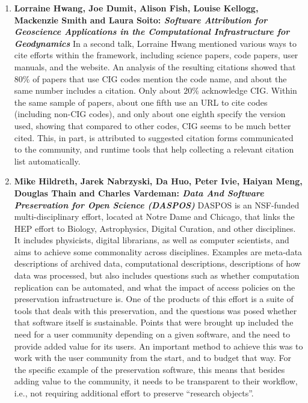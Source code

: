 \documentclass[11pt, oneside]{amsart}
\begin{document}
\begin{enumerate}
\item \textbf{Lorraine Hwang, Joe Dumit, Alison Fish, Louise Kellogg, Mackenzie
Smith and Laura Soito: \textit{Software Attribution for Geoscience Applications
in the Computational Infrastructure for Geodynamics}} In a second talk, Lorraine
Hwang mentioned various ways to cite efforts within the framework, including
science papers, code papers, user manuals, and the website. An analysis of the
resulting citations showed that $80\%$ of papers that use CIG codes mention the
code name, and about the same number includes a citation. Only about $20\%$
acknowledge CIG. Within the same sample of papers, about one fifth use an URL to
cite codes (including non-CIG codes), and only about one eighth specify the
version used, showing that compared to other codes, CIG seems to be much better
cited. This, in part, is attributed to suggested citation forms communicated to
the community, and runtime tools that help collecting a relevant citation list
automatically.

\item \textbf{Mike Hildreth, Jarek Nabrzyski, Da Huo, Peter Ivie, Haiyan Meng,
Douglas Thain and Charles Vardeman: \textit{Data And Software Preservation for
Open Science (DASPOS)}} DASPOS is an NSF-funded multi-disciplinary effort,
located at Notre Dame and Chicago, that links the HEP effort to Biology,
Astrophysics, Digital Curation, and other disciplines. It includes physicists,
digital librarians, as well as computer scientists, and aims to achieve some
commonality across disciplines. Examples are meta-data descriptions of archived
data, computational descriptions, descriptions of how data was processed, but
also includes questions such as whether computation replication can be
automated, and what the impact of access policies on the preservation
infrastructure is. One of the products of this effort is a suite of tools that
deals with this preservation, and the questions was posed whether that software
itself is sustainable. Points that were brought up included the need for a user
community depending on a given software, and the need to provide added value for
its users. An important method to achieve this was to work with the user
community from the start, and to budget that way. For the specific example of
the preservation software, this means that besides adding value to the
community, it needs to be transparent to their workflow, i.e., not requiring
additional effort to preserve ``research objects''.


\end{enumerate}
\end{document}
